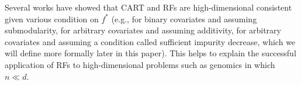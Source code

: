 \documentclass[11pt]{article}
\newcommand{\nfeats}{d}
\newcommand{\nsamples}{n}
\begin{document}
Several works 
have showed that CART and RFs are high-dimensional consistent given various condition on $f^*$ (e.g., \cite{syrgkanis2020estimation} for binary covariates and assuming submodularity, \cite{klusowski2024large} for arbitrary covariates and assuming additivity, \cite{chi2022asymptotic} for arbitrary covariates and assuming a condition called sufficient impurity decrease, which we will define more formally later in this paper). 
This helps to explain the successful application of RFs to high-dimensional problems such as genomics in which $\nsamples \ll \nfeats$.
\end{document}
